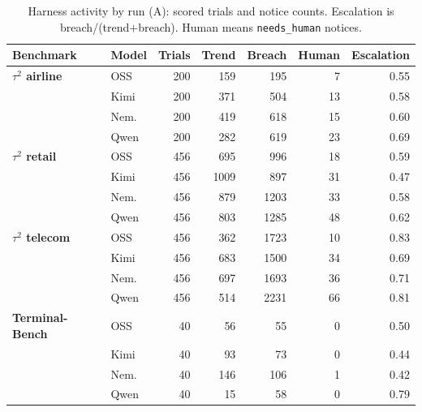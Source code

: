 \documentclass[11pt,letterpaper]{article}
\begin{document}
\begin{table}[H]
\centering\small
\setlength{\tabcolsep}{3pt}
\caption{Harness activity by run (A): scored trials and notice counts.
Escalation is breach/(trend$+$breach). Human means
\texttt{needs\_human} notices.}
\label{tab:telemetry}
\begin{tabular*}{\linewidth}{@{\extracolsep{\fill}}llrrrrr@{}}
\toprule
Benchmark & Model & Trials & Trend & Breach & Human & Escalation \\
\midrule
\textbf{$\tau^2$ airline} & OSS & 200 & 159 & 195 & 7 & 0.55 \\
 & Kimi & 200 & 371 & 504 & 13 & 0.58 \\
 & Nem. & 200 & 419 & 618 & 15 & 0.60 \\
 & Qwen & 200 & 282 & 619 & 23 & 0.69 \\
\midrule
\textbf{$\tau^2$ retail} & OSS & 456 & 695 & 996 & 18 & 0.59 \\
 & Kimi & 456 & 1009 & 897 & 31 & 0.47 \\
 & Nem. & 456 & 879 & 1203 & 33 & 0.58 \\
 & Qwen & 456 & 803 & 1285 & 48 & 0.62 \\
\midrule
\textbf{$\tau^2$ telecom} & OSS & 456 & 362 & 1723 & 10 & 0.83 \\
 & Kimi & 456 & 683 & 1500 & 34 & 0.69 \\
 & Nem. & 456 & 697 & 1693 & 36 & 0.71 \\
 & Qwen & 456 & 514 & 2231 & 66 & 0.81 \\
\midrule
\textbf{Terminal-Bench} & OSS & 40 & 56 & 55 & 0 & 0.50 \\
 & Kimi & 40 & 93 & 73 & 0 & 0.44 \\
 & Nem. & 40 & 146 & 106 & 1 & 0.42 \\
 & Qwen & 40 & 15 & 58 & 0 & 0.79 \\
\bottomrule
\end{tabular*}
\end{table}
\end{document}
